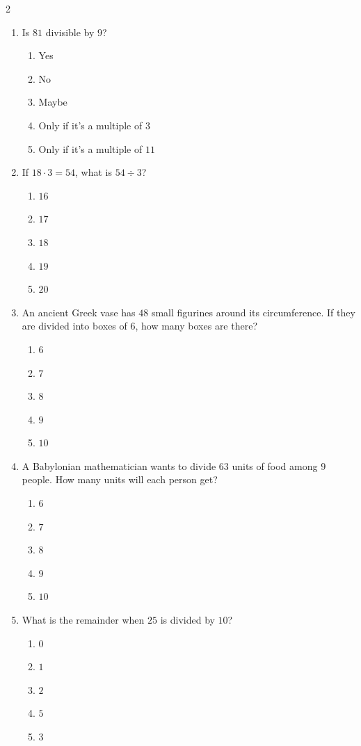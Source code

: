 \documentclass[10pt]{article}
\begin{document}
\begin{multicols}{2}
\begin{enumerate}[label=\textbf{Q\arabic*.}, leftmargin=*, itemsep=6pt, parsep=0pt]
  \item \small Is $81$ divisible by $9$?
  \begin{enumerate}[label=(\Alph*), leftmargin=0.6cm, nosep, itemsep=2pt]
    \item Yes
    \item No
    \item Maybe
    \item Only if it's a multiple of $3$
    \item Only if it's a multiple of $11$
  \end{enumerate}

  \item \small If $18 \cdot 3 = 54$, what is $54 \div 3$?
  \begin{enumerate}[label=(\Alph*), leftmargin=0.6cm, nosep, itemsep=2pt]
    \item $16$
    \item $17$
    \item $18$
    \item $19$
    \item $20$
  \end{enumerate}

  \item \small An ancient Greek vase has $48$ small figurines around its circumference. If they are divided into boxes of $6$, how many boxes are there?
  \begin{enumerate}[label=(\Alph*), leftmargin=0.6cm, nosep, itemsep=2pt]
    \item $6$
    \item $7$
    \item $8$
    \item $9$
    \item $10$
  \end{enumerate}

  \item \small A Babylonian mathematician wants to divide $63$ units of food among $9$ people. How many units will each person get?
  \begin{enumerate}[label=(\Alph*), leftmargin=0.6cm, nosep, itemsep=2pt]
    \item $6$
    \item $7$
    \item $8$
    \item $9$
    \item $10$
  \end{enumerate}

  \item \small What is the remainder when $25$ is divided by $10$?
  \begin{enumerate}[label=(\Alph*), leftmargin=0.6cm, nosep, itemsep=2pt]
    \item $0$
    \item $1$
    \item $2$
    \item $5$
    \item $3$
  \end{enumerate}

\end{enumerate}
\end{multicols}
\end{document}
